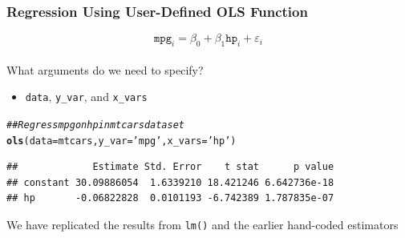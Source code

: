 \documentclass{beamer}\usepackage[]{graphicx}\usepackage[]{xcolor}
\makeatletter
\newcommand{\hlstr}[1]{\textcolor[rgb]{0.192,0.494,0.8}{#1}}%
\newcommand{\hlcom}[1]{\textcolor[rgb]{0.678,0.584,0.686}{\textit{#1}}}%
\newcommand{\hlstd}[1]{\textcolor[rgb]{0.345,0.345,0.345}{#1}}%
\newcommand{\hlkwc}[1]{\textcolor[rgb]{0.333,0.667,0.333}{#1}}%
\newcommand{\hlkwd}[1]{\textcolor[rgb]{0.737,0.353,0.396}{\textbf{#1}}}%
\newenvironment{kframe}{%
 \def\at@end@of@kframe{}%
 \ifinner\ifhmode%
  \def\at@end@of@kframe{\end{minipage}}%
  \begin{minipage}{\columnwidth}%
 \fi\fi%
 \def\FrameCommand##1{\hskip\@totalleftmargin \hskip-\fboxsep
 \colorbox{shadecolor}{##1}\hskip-\fboxsep
     \hskip-\linewidth \hskip-\@totalleftmargin \hskip\columnwidth}%
 \MakeFramed {\advance\hsize-\width
   \@totalleftmargin\z@ \linewidth\hsize
   \@setminipage}}%
 {\par\unskip\endMakeFramed%
 \at@end@of@kframe}
\newenvironment{knitrout}{}{} %
\makeatother
\begin{document}
\begin{frame}[fragile]\frametitle{Regression Using User-Defined OLS Function}
    \vspace{-1ex}
    $$\texttt{mpg}_i = \beta_0 + \beta_1 \texttt{hp}_i + \varepsilon_i$$ \\
    \vspace{2ex}
    What arguments do we need to specify?
    \begin{itemize}
        \item \texttt{data}, \texttt{y\_var}, and \texttt{x\_vars}
    \end{itemize}
\begin{knitrout}\footnotesize
{}\color{fgcolor}\begin{kframe}
\begin{alltt}
\hlcom{## Regress mpg on hp in mtcars dataset}
\hlkwd{ols}\hlstd{(}\hlkwc{data} \hlstd{= mtcars,} \hlkwc{y_var} \hlstd{=} \hlstr{'mpg'}\hlstd{,} \hlkwc{x_vars} \hlstd{=} \hlstr{'hp'}\hlstd{)}
\end{alltt}
\begin{verbatim}
##             Estimate Std. Error    t stat      p value
## constant 30.09886054  1.6339210 18.421246 6.642736e-18
## hp       -0.06822828  0.0101193 -6.742389 1.787835e-07
\end{verbatim}
\end{kframe}
\end{knitrout}
    \vspace{2ex}
    We have replicated the results from \texttt{lm()} and the earlier hand-coded estimators \\
\end{frame}
\end{document}

